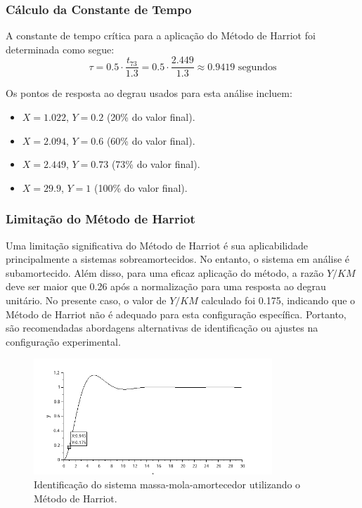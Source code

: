 \subsubsection{Cálculo da Constante de Tempo}

A constante de tempo crítica para a aplicação do Método de Harriot foi determinada como segue:
\[
    \tau = 0.5 \cdot \frac{t_{73}}{1.3} = 0.5 \cdot \frac{2.449}{1.3} \approx 0.9419 \text{ segundos}
\]

Os pontos de resposta ao degrau usados para esta análise incluem:
\begin{itemize}
    \item \(X = 1.022\), \(Y = 0.2\) (20\% do valor final).
    \item \(X = 2.094\), \(Y = 0.6\) (60\% do valor final).
    \item \(X = 2.449\), \(Y = 0.73\) (73\% do valor final).
    \item \(X = 29.9\), \(Y = 1\) (100\% do valor final).
\end{itemize}

\subsubsection{Limitação do Método de Harriot}

Uma limitação significativa do Método de Harriot é sua aplicabilidade principalmente a sistemas sobreamortecidos. No entanto, o sistema em análise é subamortecido. Além disso, para uma eficaz aplicação do método, a razão \(Y/KM\) deve ser maior que 0.26 após a normalização para uma resposta ao degrau unitário. No presente caso, o valor de \(Y/KM\) calculado foi 0.175, indicando que o Método de Harriot não é adequado para esta configuração específica. Portanto, são recomendadas abordagens alternativas de identificação ou ajustes na configuração experimental.

\begin{figure}[h]
    \centering
    \includegraphics[width=0.8\textwidth]{atividades/10-atividade/assets/sistema-t73-identificado-nromalizacao-forcada.png}
    \caption{Identificação do sistema massa-mola-amortecedor utilizando o Método de Harriot.}
    \label{fig:sistema-t73-identificado-nromalizacao-forcada}
\end{figure}

